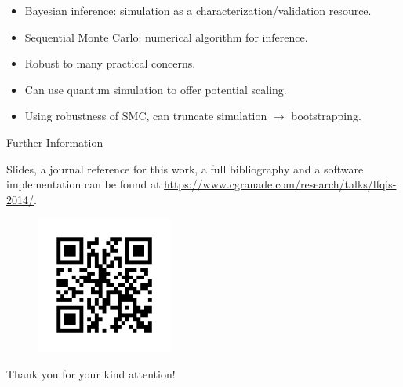 \documentclass[xcolor=dvipsnames, compress]{beamer}
\begin{document}
\begin{frame}{}

  \begin{itemize}
   \item<+-> Bayesian inference: simulation as a characterization/validation resource.
   \item<+-> Sequential Monte Carlo: numerical algorithm for inference.
   \item<+-> Robust to many practical concerns.
   \item<+-> Can use quantum simulation to offer potential scaling.
   \item<+-> Using robustness of SMC, can truncate simulation $\to$ bootstrapping.
  \end{itemize}

\end{frame}

\begin{frame}{Further Information}

  Slides, a journal reference for this work, a full bibliography and a software implementation can
  be found at \url{https://www.cgranade.com/research/talks/lfqis-2014/}.

  \begin{figure}
     \includegraphics[width=0.4\textwidth]{figures/link}
  \end{figure}

  \begin{block}{}
    Thank you for your kind attention!
  \end{block}
\end{frame}


\appendix 
\end{document}
